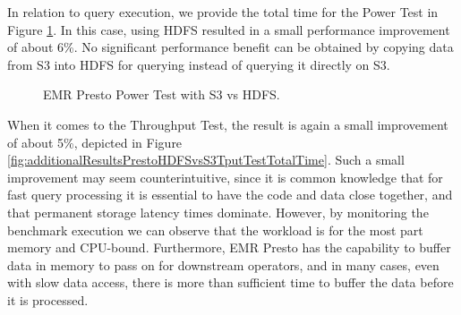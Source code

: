 In relation to query execution, we provide the total time for the Power Test in Figure \ref{fig:additionalResultsPrestoHDFSvsS3PowerTestTotalTime}. In this case, using HDFS resulted in a small performance improvement of about 6\%. No significant performance benefit can be obtained by copying data from S3 into HDFS for querying instead of querying it directly on S3.

\begin{figure}
   \begin{center}
   \end{center}
   \caption{EMR Presto Power Test with S3 vs HDFS.}
   \label{fig:additionalResultsPrestoHDFSvsS3PowerTestTotalTime}
\end{figure}

When it comes to the Throughput Test, the result is again a small improvement of about 5\%, depicted in Figure \ref{fig:additionalResultsPrestoHDFSvsS3TputTestTotalTime}. Such a small improvement may seem counterintuitive, since it is common knowledge that for fast query processing it is essential to have the code and data close together, and that permanent storage latency times dominate. However, by monitoring the benchmark execution we can observe that the workload is for the most part memory and CPU-bound. Furthermore, EMR Presto has the capability to buffer data in memory to pass on for downstream operators, and in many cases, even with slow data access, there is more than sufficient time to buffer the data before it is processed.

